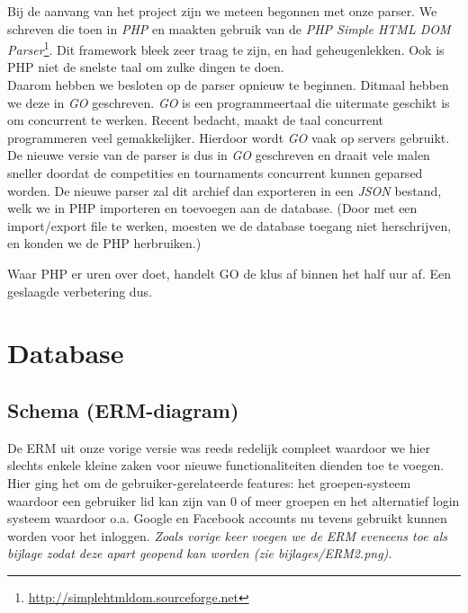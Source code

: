 \documentclass[11pt]{article}
\begin{document}
Bij de aanvang van het project zijn we meteen begonnen met onze parser. We schreven die toen in \emph{PHP} en maakten gebruik van de \emph{PHP Simple HTML DOM Parser}\footnote{\url{http://simplehtmldom.sourceforge.net}}.
Dit framework bleek zeer traag te zijn, en had geheugenlekken. Ook is PHP niet de snelste taal om zulke dingen te doen.\\

Daarom hebben we besloten op de parser opnieuw te beginnen. Ditmaal hebben we deze in \emph{GO} geschreven. \emph{GO} is een programmeertaal die uitermate geschikt is om concurrent te werken. Recent bedacht, maakt de taal concurrent programmeren veel gemakkelijker. Hierdoor wordt \emph{GO} vaak op servers gebruikt.\\

De nieuwe versie van de parser is dus in \emph{GO} geschreven en draait vele malen sneller doordat de competities en tournaments concurrent kunnen geparsed worden. De nieuwe parser zal dit archief dan exporteren in een \emph{JSON} bestand, welk we in PHP importeren en toevoegen aan de database. (Door met een import/export file te werken, moesten we de database toegang niet herschrijven, en konden we de PHP herbruiken.)

Waar PHP er uren over doet, handelt GO de klus af binnen het half uur af. Een geslaagde verbetering dus. 




\section{Database}

\subsection{Schema (ERM-diagram)}

De ERM uit onze vorige versie was reeds redelijk compleet waardoor we hier slechts enkele kleine zaken voor nieuwe functionaliteiten dienden toe te voegen.\\
Hier ging het om de gebruiker-gerelateerde features: het groepen-systeem waardoor een gebruiker lid kan zijn van 0 of meer groepen en het alternatief login systeem waardoor o.a. Google en Facebook accounts nu tevens gebruikt kunnen worden voor het inloggen.  \emph{Zoals vorige keer voegen we de ERM eveneens toe als bijlage zodat deze apart geopend kan worden (zie bijlages/ERM2.png).}
\end{document}
